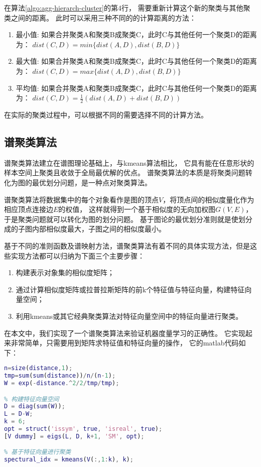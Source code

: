 在算法\ref{algo:agg-hierarch-cluster}的第4行，
需要重新计算这个新的聚类与其他聚类之间的距离。
此时可以采用三种不同的的计算距离的方法：

\begin{enumerate}
    \item 最小值: 如果合并聚类A和聚类B成聚类C，此时C与其他任何一个聚类D的距离为：
        $dist(C, D) = min\{dist(A, D), dist(B, D)\}$
    \item 最大值: 如果合并聚类A和聚类B成聚类C，此时C与其他任何一个聚类D的距离为：
        $dist(C, D) = max\{dist(A, D), dist(B, D)\}$
    \item 平均值: 如果合并聚类A和聚类B成聚类C，此时C与其他任何一个聚类D的距离为：
        $dist(C, D) = \frac{1}{2}(dist(A, D) + dist(B, D))$
\end{enumerate}

在实际的聚类过程中，可以根据不同的需要选择不同的计算方法。

\subsection{谱聚类算法}

谱聚类算法建立在谱图理论基础上，与kmeans算法相比，
它具有能在任意形状的样本空间上聚类且收敛于全局最优解的优点。
谱聚类算法的本质是将聚类问题转化为图的最优划分问题，是一种点对聚类算法。

谱聚类算法将数据集中的每个对象看作是图的顶点$V$，将顶点间的相似度量化作为相应顶点连接边$E$的权值，
这样就得到一个基于相似度的无向加权图$G(V, E)$，于是聚类问题就可以转化为图的划分问题。
基于图论的最优划分准则就是使划分成的子图内部相似度最大，子图之间的相似度最小。

基于不同的准则函数及谱映射方法，谱聚类算法有着不同的具体实现方法，但是这些实现方法都可以归纳为下面三个主要步骤：

\begin{enumerate}
    \item 构建表示对象集的相似度矩阵；
    \item 通过计算相似度矩阵或拉普拉斯矩阵的前k个特征值与特征向量，构建特征向量空间；
    \item 利用kmeans或其它经典聚类算法对特征向量空间中的特征向量进行聚类。
\end{enumerate}

在本文中，我们实现了一个谱聚类算法来验证机器度量学习的正确性。
它实现起来非常简单，只需要用到矩阵求特征值和特征向量的操作，
它的matlab代码如下：

\begin{lstlisting}[language={matlab}, caption={谱聚类算法的简单实现}]
% 将距离矩阵转换为相似度矩阵
n=size(distance,1);
tmp=sum(sum(distance))/n/(n-1);
W = exp(-distance.^2/2/tmp/tmp);

% 构建特征向量空间
D = diag(sum(W));
L = D-W;
k = 6;
opt = struct('issym', true, 'isreal', true);
[V dummy] = eigs(L, D, k+1, 'SM', opt);

% 基于特征向量进行聚类
spectural_idx = kmeans(V(:,1:k), k);

\end{lstlisting}


